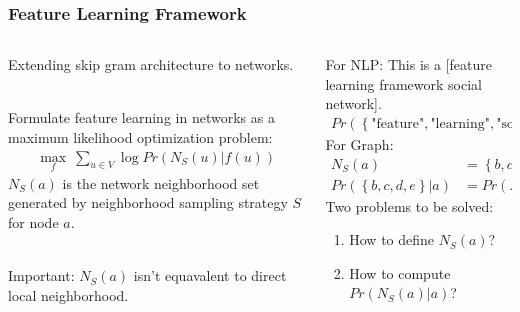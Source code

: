 \documentclass[10pt, aspectratio=169]{beamer}
\begin{document}
\begin{frame}
    \frametitle{Feature Learning Framework}
    \begin{columns}
        \begin{column}{0.5\textwidth}
            Extending skip gram architecture to networks.\par ~\\
            Formulate feature learning in networks as a maximum likelihood optimization problem:
            \begin{align*}
                \max_{f}\ \sum_{u\in V}\log Pr\left( N_S\left( u \right)| f(u)  \right) 
            \end{align*}
            $N_S\left( a \right)$ is the network neighborhood set generated by neighborhood sampling strategy $S$ for node $a$.\par ~\\
            Important: $N_S\left( a \right)$ isn’t equavalent to direct local neighborhood.
        \end{column}
        \begin{column}{0.5\textwidth}
            For NLP: This is a [feature learning \alert{framework} social network].
            \begin{align*}
                \scriptstyle
                Pr \left( \left\{ \text{"feature"}, \text{"learning"}, \text{"social"}, \text{"network"} \right\} | \text{"framework"} \right) 
            \end{align*}
            For Graph:
            \begin{align*}
                N_S\left( a \right) &= \left\{ b, c, d, e \right\} \\
            Pr\left( \left\{ b, c, d, e \right\}| a \right) &= Pr\left( N_s\left( a \right) | a \right) 
            \end{align*}
            \pause
            Two problems to be solved:
            \begin{enumerate}
                \item How to define $N_S\left( a \right) $?
                \item How to compute $Pr\left( N_S\left( a \right) |a \right) $?
            \end{enumerate}
        \end{column}
    \end{columns}
\end{frame}
\end{document}
